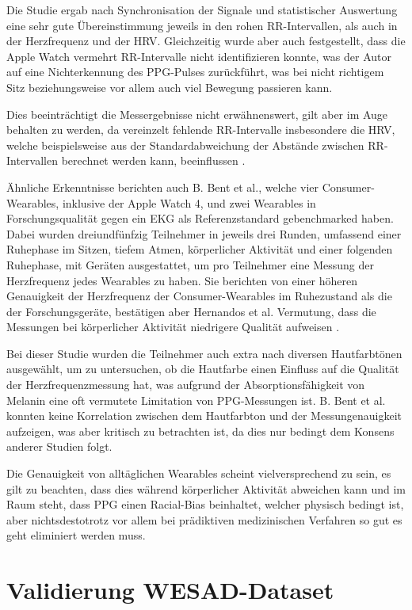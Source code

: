 Die Studie ergab nach Synchronisation der Signale und statistischer Auswertung eine sehr gute Übereinstimmung jeweils in den rohen RR-Intervallen, als auch in der Herzfrequenz und der \ac{HRV}. Gleichzeitig wurde aber auch festgestellt, dass die Apple Watch vermehrt RR-Intervalle nicht identifizieren konnte, was der Autor auf eine Nichterkennung des \ac{PPG}-Pulses zurückführt, was bei nicht richtigem Sitz beziehungsweise vor allem auch viel Bewegung passieren kann.

Dies beeinträchtigt die Messergebnisse nicht erwähnenswert, gilt aber im Auge behalten zu werden, da vereinzelt fehlende RR-Intervalle insbesondere die \ac{HRV}, welche beispielsweise aus der Standardabweichung der Abstände zwischen RR-Intervallen berechnet werden kann, beeinflussen \cite{s18082619}.

Ähnliche Erkenntnisse berichten auch B. Bent et al., welche vier Consumer-Wearables, inklusive der Apple Watch 4, und zwei Wearables in Forschungsqualität gegen ein \ac{EKG} als Referenzstandard gebenchmarked haben. Dabei wurden dreiundfünfzig Teilnehmer in jeweils drei Runden, umfassend einer Ruhephase im Sitzen, tiefem Atmen, körperlicher Aktivität und einer folgenden Ruhephase, mit Geräten ausgestattet, um pro Teilnehmer eine Messung der Herzfrequenz jedes Wearables zu haben. Sie berichten von einer höheren Genauigkeit der Herzfrequenz der Consumer-Wearables im Ruhezustand als die der Forschungsgeräte, bestätigen aber Hernandos et al. Vermutung, dass die Messungen bei körperlicher Aktivität niedrigere Qualität aufweisen \cite{Bent2020}.

Bei dieser Studie wurden die Teilnehmer auch extra nach diversen Hautfarbtönen ausgewählt, um zu untersuchen, ob die Hautfarbe einen Einfluss auf die Qualität der Herzfrequenzmessung hat, was aufgrund der Absorptionsfähigkeit von Melanin eine oft vermutete Limitation von \ac{PPG}-Messungen ist. B. Bent et al. konnten keine Korrelation zwischen dem Hautfarbton und der Messungenauigkeit aufzeigen, was aber kritisch zu betrachten ist, da dies nur bedingt dem Konsens anderer Studien folgt.

Die Genauigkeit von alltäglichen Wearables scheint vielversprechend zu sein, es gilt zu beachten, dass dies während körperlicher Aktivität abweichen kann und im Raum steht, dass \ac{PPG} einen Racial-Bias beinhaltet, welcher physisch bedingt ist, aber nichtsdestotrotz vor allem bei prädiktiven medizinischen Verfahren so gut es geht eliminiert werden muss.

\section{Validierung WESAD-Dataset}

